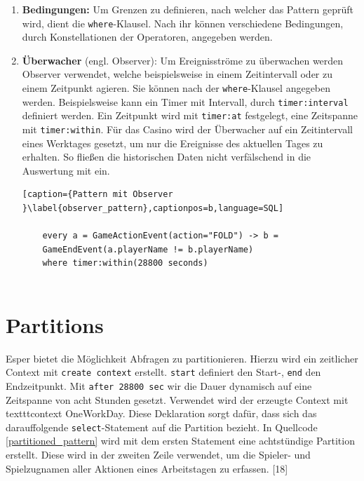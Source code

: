 \begin{enumerate}
	\begin{lstlisting}[caption={Pattern mit Follow-Operator }\label{follow_pattern},captionpos=b,language=SQL]
	
	every a = GameActionEvent(action="FOLD") -> b =
	 GameEndEvent(a.playerName != b.playerName)
	
	\end{lstlisting}
	
	\item \textbf{Bedingungen:}
	Um Grenzen zu definieren, nach welcher das Pattern geprüft wird, dient die \texttt{where}-Klausel. Nach ihr können verschiedene Bedingungen, durch Konstellationen der Operatoren, angegeben werden.
	
	\item \textbf{Überwacher} (engl. Observer):
	Um Ereignisströme zu überwachen werden Observer verwendet, welche beispielsweise in einem Zeitintervall oder zu einem Zeitpunkt agieren. Sie können nach der \texttt{where}-Klausel angegeben werden. Beispielsweise kann ein Timer mit Intervall, durch \texttt{timer:interval} definiert werden. Ein Zeitpunkt wird
	mit \texttt{timer:at} festgelegt, eine Zeitspanne mit \texttt{timer:within}. Für das Casino wird der Überwacher auf ein Zeitintervall eines Werktages gesetzt, um nur die Ereignisse des aktuellen Tages zu erhalten. So fließen die historischen Daten nicht verfälschend in die Auswertung mit ein.
	
	\begin{lstlisting}[caption={Pattern mit Observer }\label{observer_pattern},captionpos=b,language=SQL]
	
	every a = GameActionEvent(action="FOLD") -> b =
	GameEndEvent(a.playerName != b.playerName)
	where timer:within(28800 seconds)
	
	\end{lstlisting}
	
\end{enumerate}


\section{Partitions}

Esper bietet die Möglichkeit Abfragen zu partitionieren.
Hierzu wird ein zeitlicher Context mit \texttt{create context} erstellt.
\texttt{start} definiert den Start-, \texttt{end} den Endzeitpunkt.
Mit \texttt{after 28800 sec} wir die Dauer dynamisch auf eine Zeitspanne von acht Stunden gesetzt. Verwendet wird der erzeugte Context mit texttt{context OneWorkDay}. Diese Deklaration sorgt dafür, dass sich das darauffolgende \texttt{select}-Statement auf die Partition bezieht.
In Quellcode \ref{partitioned_pattern} wird mit dem ersten Statement eine achtstündige Partition erstellt. Diese wird in der zweiten Zeile verwendet, um die Spieler- und Spielzugnamen aller Aktionen eines Arbeitstagen zu erfassen.
\cite{EsperRef2018}[18]

